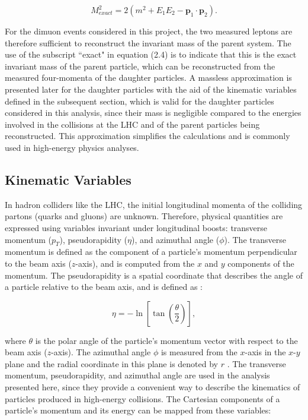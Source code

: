\documentclass[11pt, a4paper]{article}
\numberwithin{equation}{section}
\begin{document}
\begin{equation} M_{exact}^2 = 2(m^2 + E_1 E_2 - \mathbf{p}_1 \cdot \mathbf{p}_2). \end{equation}

For the dimuon events considered in this project, the two measured leptons are therefore sufficient to reconstruct the invariant mass of the parent system. The use of the subscript ``exact" in equation (2.4) is to indicate that this is the exact invariant mass of the parent particle, which can be reconstructed from the measured four-momenta of the daughter particles. A massless approximation is presented later for the daughter particles with the aid of the kinematic variables defined in the subsequent section, which is valid for the daughter particles considered in this analysis, since their mass is negligible compared to the energies involved in the collisions at the LHC and of the parent particles being reconstructed. This approximation simplifies the calculations and is commonly used in high-energy physics analyses. 

\subsection{Kinematic Variables}

In hadron colliders like the LHC, the initial longitudinal momenta of the colliding partons (quarks and gluons) are unknown. Therefore, physical quantities are expressed using variables invariant under longitudinal boosts: transverse momentum ($p_T$), pseudorapidity ($\eta$), and azimuthal angle ($\phi$). The transverse momentum is defined as the component of a particle's momentum perpendicular to the beam axis ($z$-axis), and is computed from the $x$ and $y$ components of the momentum. The pseudorapidity is a spatial coordinate that describes the angle of a particle relative to the beam axis, and is defined as \cite{cmscollaboration2008cms}:

\begin{equation} \eta = -\ln\left[\tan\left(\frac{\theta}{2}\right)\right], \end{equation}

where $\theta$ is the polar angle of the particle's momentum vector with respect to the beam axis ($z$-axis). The azimuthal angle $\phi$ is measured from the $x$-axis in the $x$-$y$ plane and the radial coordinate in this plane is denoted by $r$ \cite{cmscollaboration2008cms}. The transverse momentum, pseudorapidity, and azimuthal angle are used in the analysis presented here, since they provide a convenient way to describe the kinematics of particles produced in high-energy collisions. The Cartesian components of a particle's momentum and its energy can be mapped from these variables:
\end{document}
